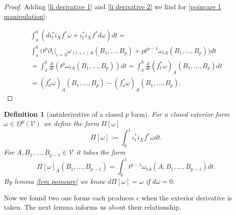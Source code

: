 \documentclass[b5paper,draft,openbib,12pt]{memoir}
\newtheorem{Def}{Definition}
\begin{document}
\begin{proof}
Adding \eqref{li derivative 1} and \eqref{li derivative 2} we find for \eqref{poincare 1 manipulation}:

\begin{align}
\int_a^b (d\iota_t^* i_X f^* \omega+ \iota_t^* i_X f^* d \omega )dt=\\
\int_a^b  \Big( t^p\partial_{\varepsilon}|_{\varepsilon=0} \omega_{(t+\varepsilon)A}(B_1,\dots, B_p)
+p t^{p-1}\omega_{tA}(B_1,\dots, B_p)\Big) dt\\
=\int_a^b  \frac{d}{dt} (t^p \omega_{tA}(B_1,\dots, B_p))dt =\int_a^b  \frac{d}{dt} (f^*_t \omega)_{A}(B_1,\dots, B_p)dt\\
=(f^*_b\omega)_A(B_1,\dots,B_p)-(f^*_a\omega)_A(B_1,\dots,B_p).
\end{align}

\end{proof}

\begin{Def}[antiderivative of a closed \(p\) form]\label{antiderivative}
For a closed exterior form \(\omega\in\Omega^{p}(\mathcal{V})\) we define the form \(\Pi [\omega]\)
\begin{equation}
\Pi\![\omega]:=\int_{0}^1 \iota^*_t i_X f^* \omega dt.
\end{equation}
For \(A,B_1,\dots , B_{p-1}\in\mathcal{V}\) it takes the form 
\begin{equation}
\Pi\![\omega]_A(B_1,\dots, B_{p-1})=\int_0^1 t^{p-1} \omega_{tA}(A,B_1,\dots, B_{p-1})dt.
\end{equation}
By lemma \ref{lem poincare} we know \(d\Pi [\omega]=\omega\) if \(d\omega=0\).
\end{Def}

Now we found two one forms each produces \(c\) when the exterior derivative is taken. The next lemma informs us about their relationship.
\end{document}
